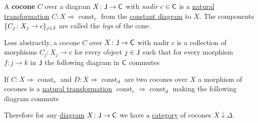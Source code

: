 \documentclass[../../main]{subfiles}
\begin{document}
\begin{definition}[Cocone]\label{def:cocone}
  A \textbf{cocone} \(C\) over a diagram \(X\colon \mathsf{J} \to \mathsf{C}\) with \textit{nadir} \(c \in \mathsf{C}\) is a \hyperref[def:natural-transformation]{natural transformation} \(C\colon X \Rightarrow \operatorname{const}_{c}\) from the \hyperref[ex:constant-diagram]{constant diagram} to \(X\).
  The components \(\{C_{j}\colon X_{j} \to c\}_{j \in \mathsf{J}}\) are called the \textit{legs} of the cone.

  Less abstractly, a cocone \(C\) over \(X\colon \mathsf{J} \to \mathsf{C}\) with nadir \(c\) is a collection of morphisms \(C_{j}\colon X_{j} \to c\) for every object \(j \in \mathsf{J}\)  such that for every morphism \(f\colon j \to k\) in \(\mathsf{J}\) the following diagram in \(\mathsf{C}\) commutes
  \begin{center}
  \end{center}

  If \(C\colon X \Rightarrow \operatorname{const}_{c}\) and \(D\colon X \Rightarrow \operatorname{const}_{d}\) are two cocones over \(X\) a morphism of cocones is a \hyperref[def:natural-transformation]{natural transformation} \(\operatorname{const}_{c} \Rightarrow \operatorname{const}_{d}\) making the following diagram commute
  \begin{center}
  \end{center}
  Therefore for any \hyperref[def:diagram]{diagram} \(X\colon \mathsf{J} \to \mathsf{C}\) we have a \hyperref[def:category]{category} of cocones \(X \downarrow \Delta\).
\end{definition}
\end{document}
